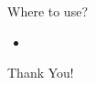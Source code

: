 \documentclass[13pt]{beamer}
\begin{document}
\begin{frame}{Where to use?}
	\textcolor{blue}{}
	\begin{itemize}
		\setlength\itemsep{1em}
		\item
	\end{itemize}
\end{frame}

\begin{frame}
\begin{center}
{\fontsize{40}{50}\selectfont Thank You!}
\end{center}
\end{frame}
\end{document}
